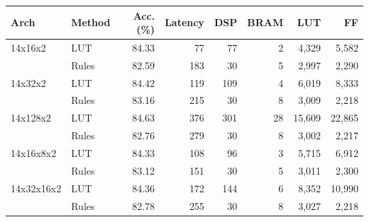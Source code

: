 \begin{tabular}{llrrrrrr}
\toprule
Arch & Method & Acc. (\%) & Latency & DSP & BRAM & LUT & FF \\
\midrule
14x16x2 & LUT & 84.33 & 77 & 77 & 2 & 4,329 & 5,582 \\
 & Rules & 82.59 & 183 & 30 & 5 & 2,997 & 2,290 \\
\midrule
14x32x2 & LUT & 84.42 & 119 & 109 & 4 & 6,019 & 8,333 \\
 & Rules & 83.16 & 215 & 30 & 8 & 3,009 & 2,218 \\
\midrule
14x128x2 & LUT & 84.63 & 376 & 301 & 28 & 15,609 & 22,865 \\
 & Rules & 82.76 & 279 & 30 & 8 & 3,002 & 2,217 \\
\midrule
14x16x8x2 & LUT & 84.33 & 108 & 96 & 3 & 5,715 & 6,912 \\
 & Rules & 83.12 & 151 & 30 & 5 & 3,011 & 2,300 \\
\midrule
14x32x16x2 & LUT & 84.36 & 172 & 144 & 6 & 8,352 & 10,990 \\
 & Rules & 82.78 & 255 & 30 & 8 & 3,027 & 2,218 \\
\bottomrule
\end{tabular}
